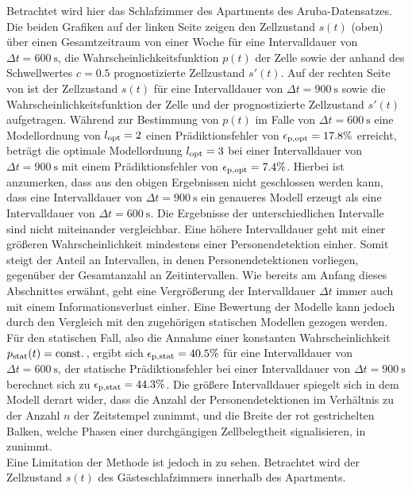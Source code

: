 Betrachtet wird hier das Schlafzimmer des Apartments des Aruba-Datensatzes. 
Die beiden Grafiken auf der linken Seite zeigen den Zellzustand $s(t)$ (oben) über einen Gesamtzeitraum von einer Woche für eine Intervalldauer von $\Delta t = \SI{600}{\second} $, die Wahrscheinlichkeitsfunktion $p(t)$ der Zelle sowie der anhand des Schwellwertes $c = 0.5$  prognostizierte Zellzustand $s'(t)$. Auf der rechten Seite von  ist der Zellzustand $s(t)$ für eine Intervalldauer von $\Delta t = \SI{900}{\second}$ sowie die Wahrscheinlichkeitsfunktion der Zelle und der prognostizierte Zellzustand $s'(t)$ aufgetragen. Während zur Bestimmung von $p(t)$ im Falle von $\Delta t = \SI{600}{\second} $ eine Modellordnung von $l_{\mathrm{opt}} =2$ einen Prädiktionsfehler von $\epsilon_{\mathrm{p,opt}} = 17.8 \% $ erreicht,
beträgt die optimale Modellordnung $l_{\mathrm{opt}} =3$ bei einer Intervalldauer von $\Delta t = \SI{900}{\second}$  mit einem Prädiktionsfehler  von $\epsilon_{\mathrm{p,opt}} = 7.4 \% $. Hierbei ist anzumerken, dass aus den obigen Ergebnissen nicht geschlossen werden kann, dass eine Intervalldauer von $\Delta t = \SI{900}{\second}$ ein genaueres Modell erzeugt als eine Intervalldauer von $\Delta t = \SI{600}{\second}$. Die Ergebnisse der unterschiedlichen Intervalle sind nicht miteinander vergleichbar. Eine höhere Intervalldauer geht mit einer größeren Wahrscheinlichkeit mindestens einer Personendetektion einher. Somit steigt der Anteil an Intervallen, in denen Personendetektionen vorliegen, gegenüber der Gesamtanzahl an Zeitintervallen. Wie bereits am Anfang dieses Abschnittes erwähnt, geht eine Vergrößerung der Intervalldauer $\Delta t$ immer auch mit einem Informationsverlust einher. Eine Bewertung der Modelle kann jedoch durch den Vergleich mit den zugehörigen statischen Modellen gezogen werden.  Für den statischen Fall, also die Annahme einer konstanten Wahrscheinlichkeit $p_{\mathrm{stat}}(t) = \mathrm{const}.\, $, ergibt sich $\epsilon_{\mathrm{p,stat}} = 40.5 \%$ für eine Intervalldauer von $\Delta t = \SI{600}{\second}$, der statische Prädiktionsfehler bei einer Intervalldauer von $\Delta t = \SI{900}{\second}$ berechnet sich zu $\epsilon_{\mathrm{p,stat}} = 44.3 \%$. Die größere Intervalldauer spiegelt sich in dem Modell derart wider, dass die Anzahl der Personendetektionen im Verhältnis zu der Anzahl $n$ der Zeitstempel zunimmt, und die Breite der rot gestrichelten Balken, welche Phasen einer durchgängigen Zellbelegtheit signalisieren, in  zunimmt.\\
Eine Limitation der Methode ist jedoch in  zu sehen. Betrachtet wird der Zellzustand $s(t)$ des Gästeschlafzimmers innerhalb des Apartments.

